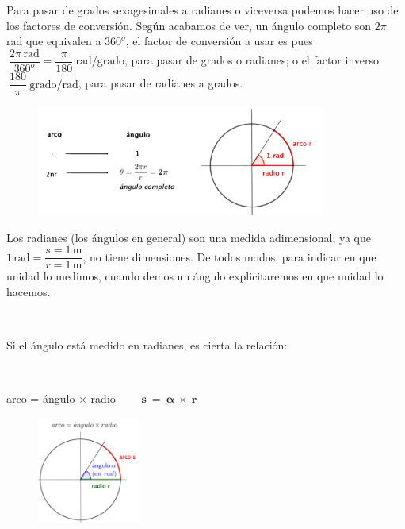 Para pasar de grados sexagesimales a radianes o viceversa podemos hacer uso de los factores de conversión. Según acabamos de ver, un ángulo completo son $2\pi$ rad que equivalen a $360^o$, el factor de conversión a usar es pues  $\ \dfrac{2\pi \, \mathrm{rad}}{360^o}= \dfrac{\pi}{180}\ \mathrm{rad} / \mathrm{grado}$, para pasar de grados o radianes; o el factor inverso $\ \dfrac{180}{\pi} \ \mathrm{grado}/\mathrm{rad}$, para pasar de radianes a grados.  

\begin{figure}[H]
	\centering
	\includegraphics[width=0.85\textwidth]{img-rt/rt03.png}
\end{figure}

\textcolor{gris}{Los radianes (los ángulos en general) son una medida adimensional, ya que $1\, \mathrm{rad} =\dfrac{s=1\, \mathrm{m}}{r=1\, \mathrm{m}}$, no tiene dimensiones. De todos modos, para indicar en que unidad lo medimos, cuando demos un ángulo explicitaremos en que unidad lo hacemos.}


\begin{multicols}{2}

$\,$

Si el ángulo está medido en radianes, es cierta la relación:

$\,$

arco = ángulo $\times $ radio
$\qquad \boldsymbol{ s\ = \ \alpha \ \times \ r }$

\begin{figure}[H]
	\centering
	\includegraphics[width=0.3\textwidth]{img-rt/rt04.png}
\end{figure}	
\end{multicols}

